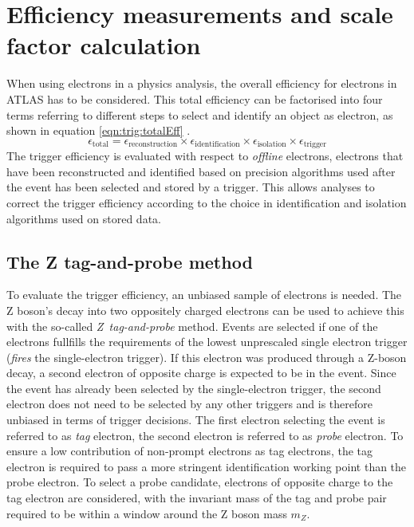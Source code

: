 \section{Efficiency measurements and scale factor calculation}
\label{sec:trigg:methodology}
When using electrons in a physics analysis,  the overall efficiency for electrons in ATLAS has to be considered. 
This total efficiency can be factorised into four terms referring to different steps to select and identify an object as electron,  as shown in equation \eqref{eqn:trig:totalEff} \cite{ElectronEfficiencyMeasurements2015}.
\begin{equation}
\epsilon_{\text{total}} = \epsilon_{\text{reconstruction}} \times \epsilon_{\text{identification}} \times \epsilon_{\text{isolation}} \times \epsilon_{\text{trigger}}  
\label{eqn:trig:totalEff}\end{equation}
The trigger efficiency is evaluated with respect to \textit{offline} electrons,  electrons that have been reconstructed and identified based on precision algorithms used after the event has been selected and stored by a trigger.  This allows analyses to correct the trigger efficiency according to the choice in identification and isolation algorithms used on stored data.

\subsection{The Z tag-and-probe method}

To evaluate the trigger efficiency,  an unbiased sample of electrons is needed.  The Z boson's decay into two oppositely charged electrons can be used to achieve this with the so-called \textit{Z~tag-and-probe} method.  Events are selected if one of the electrons fullfills the requirements of the lowest unprescaled single electron trigger (\textit{fires} the single-electron trigger).  If this electron was produced through a Z-boson decay,  a second electron of opposite charge is expected to be in the event.  Since the event has already been selected by the single-electron trigger,  the second electron does not need to be selected by any other triggers and is therefore unbiased in terms of trigger decisions.
The first electron selecting the event is referred to as \textit{tag} electron,  the second electron is referred to as \textit{probe} electron.  To ensure a low contribution of non-prompt electrons as tag electrons,  the tag electron is required to pass a more stringent identification working point than the probe electron.
To select a probe candidate,  electrons of opposite charge to the tag electron are considered,  with the invariant mass of the tag and probe pair required to be within a window around the Z boson mass  $m_Z$.  

